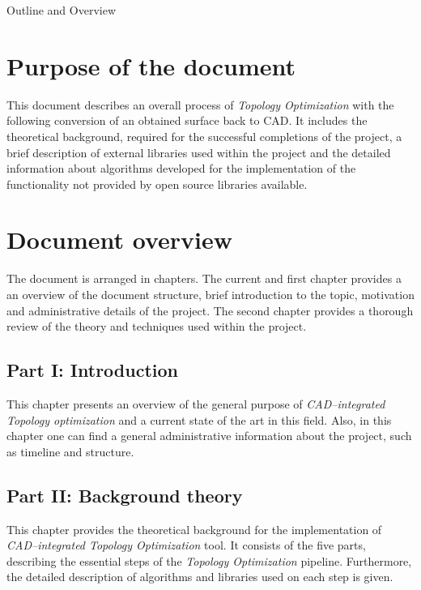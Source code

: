 \clearemptydoublepage

{}

\begin{center}
	\huge{Outline and Overview}
\end{center}




\section*{Purpose of the document}
This document describes an overall process of \textit{Topology Optimization} with the following conversion of an obtained surface back to CAD. It includes the theoretical background, required for the successful completions of the project, a brief description of external libraries used within the project and the detailed information about algorithms developed for the implementation of the functionality not provided by open source libraries available.

\section*{Document overview}
The document is arranged in chapters. The current and first chapter provides a an overview of the document structure, brief introduction to the topic, motivation and administrative details of the project. The second chapter provides a thorough review of the theory and techniques used within the project.
\subsection*{Part I: Introduction}

  \vspace{1mm}

\noindent  This chapter presents an overview of the general purpose of \textit{CAD--integrated Topology optimization} and a current state of the art in this field. Also, in this chapter one can find a general administrative information about the project, such as timeline and structure.
 \\


\subsection*{Part II: Background theory}

  \vspace{1mm}

\noindent This chapter provides the theoretical background for the implementation of \textit{CAD--integrated Topology Optimization} tool. It consists of the five parts, describing the essential steps of the \textit{Topology Optimization} pipeline. Furthermore, the detailed description of algorithms and libraries used on each step is given.
\\